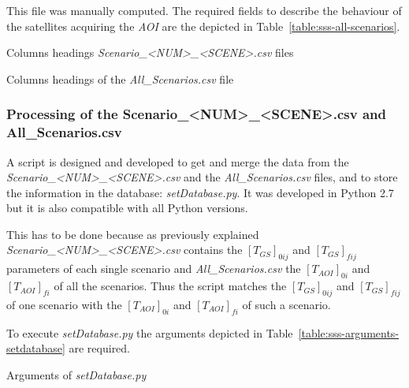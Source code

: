 \begin{itemize}
This file was manually computed. The required fields to describe the behaviour
of the satellites acquiring the \emph{AOI} are the depicted in Table~\ref{table:sss-all-scenarios}.

\begin{table}[hp]
  \centering
  {\small
  
  }
  \caption{Columns headings \emph{Scenario\_<NUM>\_<SCENE>.csv} files}
  \label{table:sss-headings-scenario2}
\end{table}

\begin{table}[hp]
  \centering
  {\small
  
  }
  \caption{Columns headings of the \emph{All\_Scenarios.csv} file}
  \label{table:sss-all-scenarios}
\end{table}
\end{itemize}


\subsubsection{Processing of the Scenario\_<NUM>\_<SCENE>.csv and
 All\_Scenarios.csv}
\label{subsubsec:processing-files}

A script is designed and developed to get and merge the data from the \emph{Scenario\_<NUM>\_<SCENE>.csv} and the \emph{All\_Scenarios.csv} files, and to store the information in the database:  \emph{setDatabase.py}. It was developed in Python 2.7 but it is also compatible with all Python versions.

This has to be done because as previously explained
\emph{Scenario\_<NUM>\_<SCENE>.csv} contains the $[T_{GS}]_{0ij}$ and $[T_{GS}]_{fij}$
parameters of each single scenario and \emph{All\_Scenarios.csv} the
$[T_{AOI}]_{0i}$ and $[T_{AOI}]_{fi}$ of all the scenarios. Thus the script matches the
$[T_{GS}]_{0ij}$ and $[T_{GS}]_{fij}$ of one scenario with the $[T_{AOI}]_{0i}$ and $[T_{AOI}]_{fi}$ of such a scenario.

To execute \emph{setDatabase.py} the arguments depicted in Table~\ref{table:sss-arguments-setdatabase} are required.
\begin{table}[hp]
  \centering
  {\small
  
  }
  \caption{Arguments of \emph{setDatabase.py}}
  \label{table:sss-arguments-setdatabase}
\end{table}

